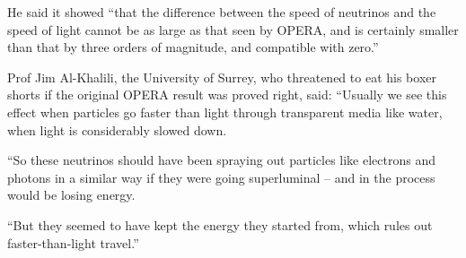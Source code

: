 \documentclass[11pt]{article}
\begin{document}
He said it showed ``that the difference between the speed of neutrinos
and the speed of light cannot be as large as that seen by OPERA, and
is certainly smaller than that by three orders of magnitude, and
compatible with zero.''

Prof Jim Al-Khalili, the University of Surrey, who threatened to eat
his boxer shorts if the original OPERA result was proved right, said:
``Usually we see this effect when particles go faster than light
through transparent media like water, when light is considerably
slowed down.

``So these neutrinos should have been spraying out particles like
electrons and photons in a similar way if they were going superluminal
– and in the process would be losing energy.

``But they seemed to have kept the energy they started from, which
rules out faster-than-light travel.''

\vfill


\nocite{*}

\end{document}
